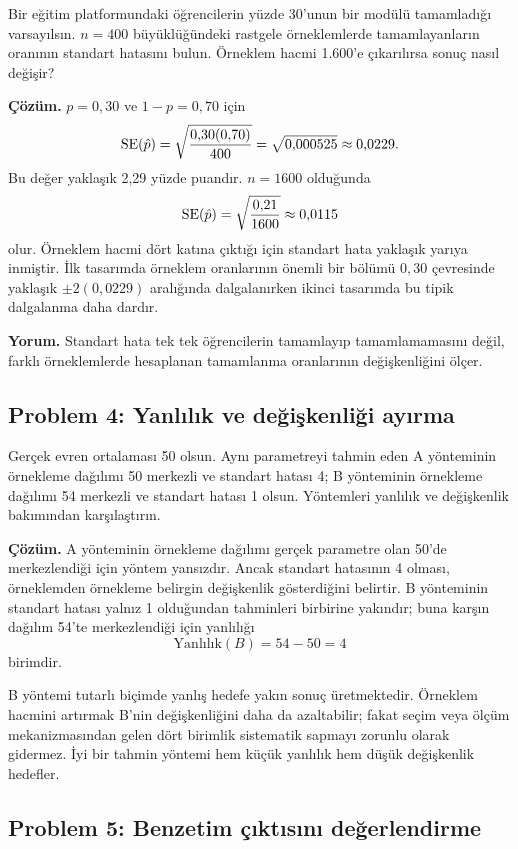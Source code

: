 Bir eğitim platformundaki öğrencilerin yüzde 30'unun bir modülü tamamladığı
varsayılsın. $n=400$ büyüklüğündeki rastgele örneklemlerde tamamlayanların
oranının standart hatasını bulun. Örneklem hacmi 1.600'e çıkarılırsa sonuç
nasıl değişir?

\textbf{Çözüm.} $p=0{,}30$ ve $1-p=0{,}70$ için
\[
\operatorname{SE}(\hat p)=\sqrt{\frac{0{,}30(0{,}70)}{400}}
=\sqrt{0{,}000525}\approx0{,}0229.
\]
Bu değer yaklaşık 2,29 yüzde puandır. $n=1600$ olduğunda
\[
\operatorname{SE}(\hat p)=\sqrt{\frac{0{,}21}{1600}}
\approx0{,}0115
\]
olur. Örneklem hacmi dört katına çıktığı için standart hata yaklaşık yarıya
inmiştir. İlk tasarımda örneklem oranlarının önemli bir bölümü $0{,}30$
çevresinde yaklaşık $\pm2(0{,}0229)$ aralığında dalgalanırken ikinci tasarımda
bu tipik dalgalanma daha dardır.

\textbf{Yorum.} Standart hata tek tek öğrencilerin tamamlayıp tamamlamamasını
değil, farklı örneklemlerde hesaplanan tamamlanma oranlarının değişkenliğini
ölçer.

\subsection*{Problem 4: Yanlılık ve değişkenliği ayırma}

Gerçek evren ortalaması 50 olsun. Aynı parametreyi tahmin eden A yönteminin
örnekleme dağılımı 50 merkezli ve standart hatası 4; B yönteminin örnekleme
dağılımı 54 merkezli ve standart hatası 1 olsun. Yöntemleri yanlılık ve
değişkenlik bakımından karşılaştırın.

\textbf{Çözüm.} A yönteminin örnekleme dağılımı gerçek parametre olan 50'de
merkezlendiği için yöntem yansızdır. Ancak standart hatasının 4 olması,
örneklemden örnekleme belirgin değişkenlik gösterdiğini belirtir. B yönteminin
standart hatası yalnız 1 olduğundan tahminleri birbirine yakındır; buna karşın
dağılım 54'te merkezlendiği için yanlılığı
\[
\text{Yanlılık}(B)=54-50=4
\]
birimdir.

B yöntemi tutarlı biçimde yanlış hedefe yakın sonuç üretmektedir. Örneklem
hacmini artırmak B'nin değişkenliğini daha da azaltabilir; fakat seçim veya
ölçüm mekanizmasından gelen dört birimlik sistematik sapmayı zorunlu olarak
gidermez. İyi bir tahmin yöntemi hem küçük yanlılık hem düşük değişkenlik
hedefler.

\subsection*{Problem 5: Benzetim çıktısını değerlendirme}

